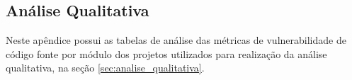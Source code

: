 \begin{apendicesenv}
\chapter{Análise Qualitativa} \label{anex:analise_qualitativa}

Neste apêndice possui as tabelas de análise das métricas de vulnerabilidade de código fonte por módulo
dos projetos utilizados para realização da análise qualitativa, na seção \ref{sec:analise_qualitativa}.


\begin{table}[h]
\caption{Projeto Bash}
\end{table}




\end{apendicesenv}
